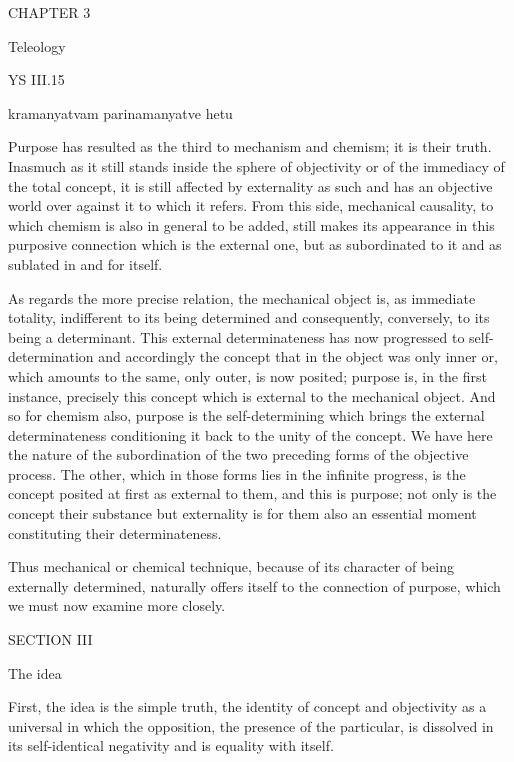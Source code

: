 CHAPTER 3

Teleology

YS III.15

    kramanyatvam parinamanyatve hetu

Purpose has resulted as the third
to mechanism and chemism;
it is their truth.
Inasmuch as it still stands
inside the sphere of objectivity
or of the immediacy of the total concept,
it is still affected by externality as such
and has an objective world over
against it to which it refers.
From this side, mechanical causality,
to which chemism is also in general to be added,
still makes its appearance in this purposive connection
which is the external one,
but as subordinated to it
and as sublated in and for itself.

As regards the more precise relation,
the mechanical object is, as immediate totality,
indifferent to its being determined and consequently,
conversely, to its being a determinant.
This external determinateness has now
progressed to self-determination
and accordingly the concept that
in the object was only inner
or, which amounts to the same,
only outer, is now posited;
purpose is, in the first instance,
precisely this concept which is
external to the mechanical object.
And so for chemism also, purpose is the self-determining
which brings the external determinateness conditioning it
back to the unity of the concept.
We have here the nature of the subordination of
the two preceding forms of the objective process.
The other, which in those forms lies in the infinite progress,
is the concept posited at first as external to them,
and this is purpose;
not only is the concept their substance
but externality is for them also
an essential moment constituting their determinateness.

Thus mechanical or chemical technique,
because of its character of being externally determined,
naturally offers itself to the connection of purpose,
which we must now examine more closely.

SECTION III

The idea

First, the idea is the simple truth,
the identity of concept and objectivity as a
universal in which the opposition,
the presence of the particular,
is dissolved in its self-identical negativity
and is equality with itself.

